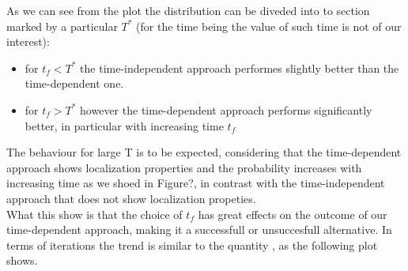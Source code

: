          

        As we can see from the plot the distribution can be diveded into to section marked by a particular $T^*$ (for the time being the value of such time is not of our interest):
        \begin{itemize}
            \item for $t_f<T^*$ the time-independent approach performes slightly better than the time-dependent one.
            \item for $t_f>T^*$ however the time-dependent approach performs significantly better, in particular with increasing time $t_f$
        \end{itemize}
        The behaviour for large T is to be expected, considering that the time-dependent approach shows localization properties and the probability increases with increasing time as we shoed in Figure?, in contrast with the time-independent approach that does not show localization propeties.\\ What this show is that the choice of $t_f$ has great effects on the outcome of our time-dependent approach, making it a successfull or unsuccesfull alternative.
        In terms of iterations the trend is similar to the quantity \quantity, as the following plot shows.

        

